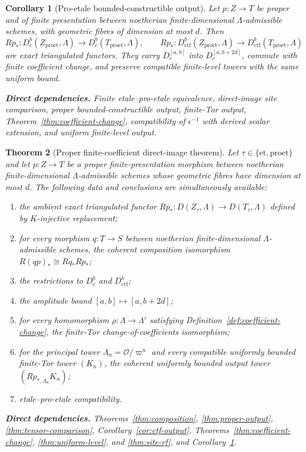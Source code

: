 \documentclass[10pt]{article}
\newtheorem{theorem}{Theorem}[section]
\newtheorem{corollary}[theorem]{Corollary}
\theoremstyle{definition}
\newcommand{\Dbc}{D^b_c}
\newcommand{\Dctf}{D^b_{\mathrm{ctf}}}
\newcommand{\deps}[1]{\par\smallskip\noindent\textbf{Direct dependencies.} #1}
\begin{document}
\begin{corollary}[Pro-etale bounded-constructible output]
\label{cor:proet-output}
Let $p:Z\to T$ be proper and of finite presentation between noetherian
finite-dimensional $\Lambda$-admissible schemes, with geometric fibres of
dimension at most $d$.
Then
\[
 Rp_*:\Dbc(Z_{\mathrm{proet}},\Lambda)\longrightarrow
       \Dbc(T_{\mathrm{proet}},\Lambda),
 \qquad
 Rp_*:\Dctf(Z_{\mathrm{proet}},\Lambda)\longrightarrow
       \Dctf(T_{\mathrm{proet}},\Lambda)
\]
are exact triangulated functors.  They carry $D_c^{[a,b]}$ into
$D_c^{[a,b+2d]}$, commute with finite coefficient change, and preserve
compatible finite-level towers with the same uniform bound.
\deps{Finite etale--pro-etale equivalence, direct-image site comparison,
proper bounded-constructible output, finite-Tor output,
Theorem~\ref{thm:coefficient-change}, compatibility of
$\epsilon^{-1}$ with derived scalar extension, and uniform finite-level
output.}
\end{corollary}

\begin{theorem}[Proper finite-coefficient direct-image theorem]
Let $\tau\in\{\mathrm{et},\mathrm{proet}\}$ and let $p:Z\to T$ be a proper
finite-presentation morphism between noetherian finite-dimensional
$\Lambda$-admissible schemes whose geometric fibres have dimension at most
$d$.  The following data and conclusions are simultaneously available:
\begin{enumerate}
\item the ambient exact triangulated functor
      $Rp_*:D(Z_\tau,\Lambda)\to D(T_\tau,\Lambda)$ defined by
      $K$-injective replacement;
\item for every morphism $q:T\to S$ between noetherian finite-dimensional
      $\Lambda$-admissible schemes, the coherent composition isomorphism
      $R(qp)_*\cong Rq_*Rp_*$;
\item the restrictions to $\Dbc$ and $\Dctf$;
\item the amplitude bound $[a,b]\mapsto[a,b+2d]$;
\item for every homomorphism $\rho:\Lambda\to\Lambda'$ satisfying
      Definition~\ref{def:coefficient-change}, the finite-Tor
      change-of-coefficients isomorphism;
\item for the principal tower $\Lambda_n=\mathcal O/\varpi^n$ and every
      compatible uniformly bounded finite-Tor tower $(K_n)$, the coherent
      uniformly bounded output tower $(Rp_{*,\Lambda_n}K_n)$;
\item etale--pro-etale compatibility.
\end{enumerate}
\deps{Theorems~\ref{thm:composition}, \ref{thm:proper-output},
\ref{thm:tensor-comparison}, Corollary~\ref{cor:ctf-output},
Theorems~\ref{thm:coefficient-change}, \ref{thm:uniform-level}, and
\ref{thm:site-rf}, and Corollary~\ref{cor:proet-output}.}
\end{theorem}
\end{document}
